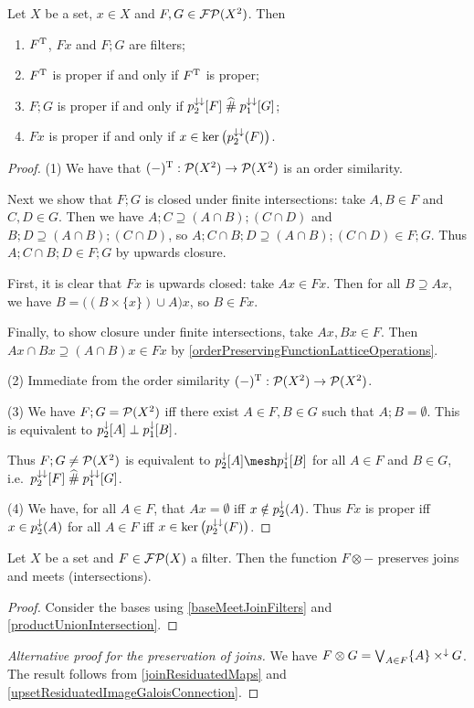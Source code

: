 \begin{lemma} \label{filterOperationsOnRelationFilters}
Let $X$ be a set, $x\in X$ and $F,G\in\operatorname{\mathcal{FP}}(X^2)$. Then
\begin{enumerate}
\item $F^{\mathrm{T}}$, $Fx$ and $F;G$ are filters;
\item $F^{\mathrm{T}}$ is proper \textup{if and only if} $F^{\mathrm{T}}$ is proper;
\item $F;G$ is proper \textup{if and only if} $p_2^{\downarrow\downarrow}[F]\mathrel{\widehat{\#}} p_1^{\downarrow\downarrow}[G]$;
\item $Fx$ is proper \textup{if and only if} $x\in\ker\big(p_2^{\downarrow\downarrow}(F)\big)$.
\end{enumerate}
\end{lemma}
\begin{proof}
(1) We have that $(-)^{\mathrm{T}}:\operatorname{\mathcal{P}}(X^2)\to\operatorname{\mathcal{P}}(X^2)$ is an order similarity. 

Next we show that $F;G$ is closed under finite intersections: take $A,B\in F$ and $C,D\in G$. Then we have $A;C \supseteq (A\cap B);(C\cap D)$ and $B;D \supseteq (A\cap B);(C\cap D)$, so $A;C \cap B;D \supseteq (A\cap B);(C\cap D) \in F;G$. Thus $A;C \cap B;D\in F;G$ by upwards closure.

First, it is clear that $Fx$ is upwards closed: take $Ax\in Fx$. Then for all $B\supseteq Ax$, we have $B = \big((B\times\{x\})\cup A\big)x$, so $B\in Fx$.

Finally, to show closure under finite intersections, take $Ax, Bx\in F$. Then $Ax\cap Bx \supseteq (A\cap B)x \in Fx$ by \ref{orderPreservingFunctionLatticeOperations}.

(2) Immediate from the order similarity $(-)^{\mathrm{T}}:\operatorname{\mathcal{P}}(X^2)\to\operatorname{\mathcal{P}}(X^2)$.

(3) We have $F;G = \operatorname{\mathcal{P}}(X^2)$ iff there exist $A\in F,B\in G$ such that $A;B = \emptyset$. This is equivalent to $p_2^{\downarrow}[A]\perp p_1^{\downarrow}[B]$.

Thus $F;G \neq \operatorname{\mathcal{P}}(X^2)$ is equivalent to $p_2^{\imf}[A]\mesh p_1^{\imf}[B]$ for all $A\in F$ and $B\in G$, i.e.\ $p_2^{\downarrow\downarrow}[F]\mathrel{\widehat{\#}} p_1^{\downarrow\downarrow}[G]$.

(4) We have, for all $A\in F$, that $Ax = \emptyset$ iff $x\notin p_2^\downarrow(A)$. Thus $Fx$ is proper iff $x\in p_2^\downarrow(A)$ for all $A\in F$ iff $x\in \ker\big(p_2^{\downarrow\downarrow}(F)\big)$.
\end{proof}

\begin{proposition} \label{meetsJoinsAdjoiningProduct}
Let $X$ be a set and $F\in\operatorname{\mathcal{FP}}(X)$ a filter. Then the function $F\otimes -$ preserves joins and meets (intersections).
\end{proposition}
\begin{proof}
Consider the bases using \ref{baseMeetJoinFilters} and \ref{productUnionIntersection}.
\end{proof}
\begin{proof}[Alternative proof for the preservation of joins]
We have $F\otimes G = \bigvee_{A\in F}\{A\}\times^{\downarrow}G$. The result follows from \ref{joinResiduatedMaps} and \ref{upsetResiduatedImageGaloisConnection}. 
\end{proof}

